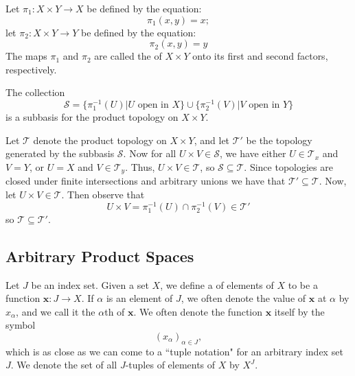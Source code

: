 \documentclass[12pt, a4paper, twoside, openright, titlepage]{book}
\begin{document}
\begin{defn}{}{}
    Let $\pi_1:X\times Y\rightarrow X$ be defined by the equation: \begin{equation*}
        \pi_1(x,y) = x;
    \end{equation*}
    let $\pi_2:X\times Y\rightarrow Y$ be defined by the equation: \begin{equation*}
        \pi_2(x,y) = y
    \end{equation*}
    The maps $\pi_1$ and $\pi_2$ are called the  of $X\times Y$ onto its first and second factors, respectively.
\end{defn}


\begin{thm}{}{}
    The collection \begin{equation*}
        \mathcal{S} = \{\pi_1^{-1}(U)\vert U\text{ open in }X\}\cup\{\pi_2^{-1}(V)\vert V\text{ open in }Y\}
    \end{equation*}
    is a subbasis for the product topology on $X\times Y$.
\end{thm}
\begin{proof*}{}{}
    Let $\mathcal{T}$ denote the product topology on $X\times Y$, and let $\mathcal{T}'$ be the topology generated by the subbasis $\mathcal{S}$. Now for all $U \times V \in \mathcal{S}$, we have either $U \in \mathcal{T}_x$ and $V = Y$, or $U = X$ and $V \in \mathcal{T}_y$. Thus, $U\times V \in \mathcal{T}$, so $\mathcal{S} \subseteq \mathcal{T}$. Since topologies are closed under finite intersections and arbitrary unions we have that $\mathcal{T}' \subseteq \mathcal{T}$. Now, let $U \times V \in \mathcal{T}$. Then observe that \begin{equation*}
        U\times V = \pi_1^{-1}(U)\cap\pi_2^{-1}(V) \in \mathcal{T}'
    \end{equation*}
    so $\mathcal{T} \subseteq \mathcal{T}'$.
\end{proof*}


\subsection{Arbitrary Product Spaces}

\begin{defn}{}{}
    Let $J$ be an index set. Given a set $X$, we define a  of elements of $X$ to be a function $\mathbf{x}:J\rightarrow X$. If $\alpha$ is an element of $J$, we often denote the value of $\mathbf{x}$ at $\alpha$ by $x_{\alpha}$, and we call it the $\alpha$th  of $\mathbf{x}$. We often denote the function $\mathbf{x}$ itself by the symbol \begin{equation*}
        (x_{\alpha})_{\alpha \in J},
    \end{equation*}
    which is as close as we can come to a ``tuple notation" for an arbitrary index set $J$. We denote the set of all $J$-tuples of elements of $X$ by $X^J$.
\end{defn}
\end{document}
